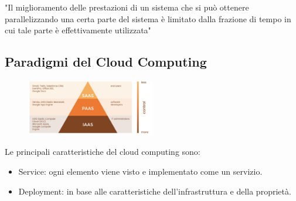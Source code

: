 \documentclass{article}
\begin{document}
		"Il miglioramento delle prestazioni di un sistema che si può ottenere parallelizzando una certa parte del sistema è limitato dalla frazione di tempo in cui tale parte è effettivamente utilizzata"
		
		\subsection{Paradigmi del Cloud Computing}
		\begin{figure}[ht]
		\centering
		\includegraphics[width=0.5\textwidth]{SAC_04.png}
		\end{figure}
		
		Le principali caratteristiche del cloud computing sono:
		\begin{itemize}
		    \item Service: ogni elemento viene visto e implementato come un servizio. 
		    \item Deployment: in base alle caratteristiche dell'infrastruttura e della proprietà.
		\end{itemize}
		
\end{document}
